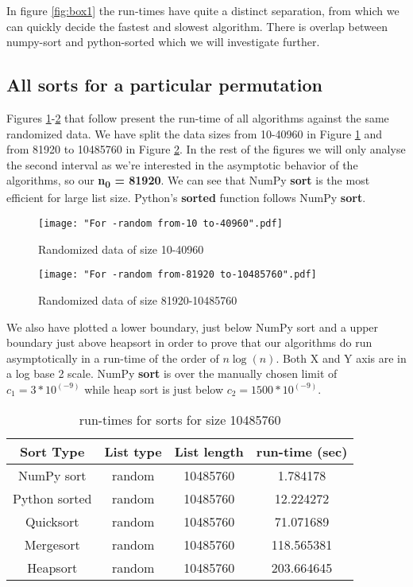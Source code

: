 \documentclass[sigconf, nonacm, natbib, screen, balance=False]{acmart}
\begin{document}
In figure \ref{fig:box1} the run-times have quite a distinct separation, from which we can quickly decide the fastest and slowest algorithm. There is overlap between numpy-sort and python-sorted which we will investigate further.

\subsection{All sorts for a particular permutation }\label{allsorts}

Figures \ref{fig:random1}-\ref{fig:random2} that follow present the run-time of all algorithms against the same randomized data. We have split the data sizes from 10-40960 in Figure \ref{fig:random1} and from 81920 to 10485760 in Figure \ref{fig:random2}. In the rest of the figures we will only analyse the second interval as we're interested in the asymptotic behavior of the algorithms, so our \textbf{n\textsubscript{0} = 81920}.\newline
We can see that NumPy \textbf{sort} is the most efficient for large list size. Python's \textbf{sorted} function follows NumPy \textbf{sort}.

\begin{figure}[ht]
\texttt{[image: "For -random from-10 to-40960".pdf]}
    \caption{Randomized data of size 10-40960 }
    \label{fig:random1}
\end{figure}

\begin{figure}[ht]
\texttt{[image: "For -random from-81920 to-10485760".pdf]}
    \caption{Randomized data of size 81920-10485760}
    \label{fig:random2}
\end{figure}


We also have plotted a lower boundary, just below NumPy sort and a upper boundary just above heapsort in order to prove that our algorithms do run asymptotically in a run-time of the order of \textbf{$n\log \left(n\right)$}. Both X and Y axis are in a log base 2 scale. NumPy \textbf{sort} is over the manually chosen limit of \textbf{$c_1=3 * 10^(-9)$} while heap sort is just below \textbf{$c_2= 1500  * 10^(-9)$}.

\begin{table}[ht]
\caption{run-times for sorts for size 10485760}
\label{tab:table1}
\begin{center}
\begin{tabular}{|c|c|c|c|} 
\hline
Sort Type & List type & List length & run-time (sec) \\
\hline
NumPy sort &	random &	10485760 &	1.784178 \\
Python sorted &	random &	10485760 &	12.224272 \\
Quicksort &	random &	10485760 &	71.071689 \\
Mergesort &	random &	10485760 &	118.565381 \\
Heapsort &	random &	10485760 &	203.664645 \\
\hline
\end{tabular}
\end{center}
\end{table}
\end{document}
